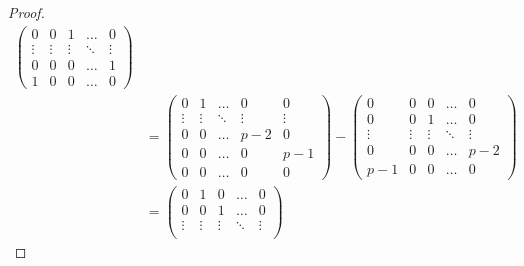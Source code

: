 \documentclass[12pt]{article}
\theoremstyle{definition}
\begin{document}
\begin{proof}
\begin{align*}
\begin{pmatrix}
		                                                                     0      & 0      & 1      & \dots  & 0      \\
		                                                                     \vdots & \vdots & \vdots & \ddots & \vdots \\
		                                                                     0      & 0      & 0      & \dots  & 1      \\
		                                                                     1      & 0      & 0      & \dots  & 0
	                                                                     \end{pmatrix} \\
                      & = \begin{pmatrix}
		                          0      & 1      & \dots  & 0      & 0      \\
		                          \vdots & \vdots & \ddots & \vdots & \vdots \\
		                          0      & 0      & \dots  & p-2    & 0      \\
		                          0      & 0      & \dots  & 0      & p-1    \\
		                          0      & 0      & \dots  & 0      & 0
	                          \end{pmatrix} - \begin{pmatrix}
		                                          0      & 0      & 0      & \dots  & 0      \\
		                                          0      & 0      & 1      & \dots  & 0      \\
		                                          \vdots & \vdots & \vdots & \ddots & \vdots \\
		                                          0      & 0      & 0      & \dots  & p-2    \\
		                                          p - 1  & 0      & 0      & \dots  & 0
	                                          \end{pmatrix}                            \\
                      & = \begin{pmatrix}
		                          0      & 1      & 0      & \dots  & 0      \\
		                          0      & 0      & 1      & \dots  & 0      \\
		                          \vdots & \vdots & \vdots & \ddots & \vdots \\

\end{pmatrix}
\end{align*}
\end{proof}
\end{document}

